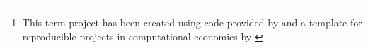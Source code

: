 \begin{abstract}

Some abstract here.\footnote{This term project has been created using code provided by \citet{Brendler2019} and a template for reproducible projects in computational economics by \citet{GaudeckerEconProjectTemplates}}

\end{abstract}
